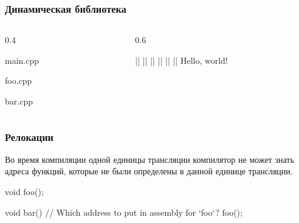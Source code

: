 \documentclass[compress, 10pt, aspectratio=169]{beamer}
\begin{document}
\begin{frame}[fragile]

    \frametitle{Динамическая библиотека}

    \begin{columns}[T]

        \begin{column}{0.4\textwidth}

                {main.cpp}

                {foo.cpp}

                {bar.cpp}

        \end{column}

        \begin{column}{0.6\textwidth}

            \begin{terminalwindow}[||]
||
||
||
||
||
||
Hello, world!
            \end{terminalwindow}

        \end{column}

    \end{columns}

\end{frame}

\begin{frame}[fragile]

    \frametitle{Релокации}

    Во время компиляции одной единицы трансляции компилятор
    не может знать адреса функций, которые не были определены
    в данной единице трансляции.

    \begin{myinplacelisting}[minted language=cpp]
void foo();

void bar() {
    // Which address to put in assembly for `foo`?
    foo();
}
    \end{myinplacelisting}

\end{frame}
\end{document}
